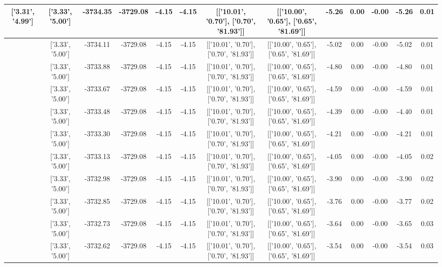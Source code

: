 \begin{table}[htbp]
\begin{adjustbox}{angle=90}
\begin{tabular}{|c|c|c|c|c|c|c|c|c|c|c|c|c|}
 ['3.31', '4.99'] & ['3.33', '5.00'] & -3734.35 & -3729.08 & -4.15 & -4.15 & [['10.01', '0.70'], ['0.70', '81.93']] & [['10.00', '0.65'], ['0.65', '81.69']] & -5.26 & 0.00 & -0.00 & -5.26 & 0.01\\ \hline
 ['3.31', '4.99'] & ['3.33', '5.00'] & -3734.11 & -3729.08 & -4.15 & -4.15 & [['10.01', '0.70'], ['0.70', '81.93']] & [['10.00', '0.65'], ['0.65', '81.69']] & -5.02 & 0.00 & -0.00 & -5.02 & 0.01\\ \hline
 ['3.31', '4.99'] & ['3.33', '5.00'] & -3733.88 & -3729.08 & -4.15 & -4.15 & [['10.01', '0.70'], ['0.70', '81.93']] & [['10.00', '0.65'], ['0.65', '81.69']] & -4.80 & 0.00 & -0.00 & -4.80 & 0.01\\ \hline
 ['3.31', '4.99'] & ['3.33', '5.00'] & -3733.67 & -3729.08 & -4.15 & -4.15 & [['10.01', '0.70'], ['0.70', '81.93']] & [['10.00', '0.65'], ['0.65', '81.69']] & -4.59 & 0.00 & -0.00 & -4.59 & 0.01\\ \hline
 ['3.32', '4.99'] & ['3.33', '5.00'] & -3733.48 & -3729.08 & -4.15 & -4.15 & [['10.01', '0.70'], ['0.70', '81.93']] & [['10.00', '0.65'], ['0.65', '81.69']] & -4.39 & 0.00 & -0.00 & -4.40 & 0.01\\ \hline
 ['3.32', '5.00'] & ['3.33', '5.00'] & -3733.30 & -3729.08 & -4.15 & -4.15 & [['10.01', '0.70'], ['0.70', '81.93']] & [['10.00', '0.65'], ['0.65', '81.69']] & -4.21 & 0.00 & -0.00 & -4.21 & 0.01\\ \hline
 ['3.32', '5.00'] & ['3.33', '5.00'] & -3733.13 & -3729.08 & -4.15 & -4.15 & [['10.01', '0.70'], ['0.70', '81.93']] & [['10.00', '0.65'], ['0.65', '81.69']] & -4.05 & 0.00 & -0.00 & -4.05 & 0.02\\ \hline
 ['3.32', '5.00'] & ['3.33', '5.00'] & -3732.98 & -3729.08 & -4.15 & -4.15 & [['10.01', '0.70'], ['0.70', '81.93']] & [['10.00', '0.65'], ['0.65', '81.69']] & -3.90 & 0.00 & -0.00 & -3.90 & 0.02\\ \hline
 ['3.32', '5.00'] & ['3.33', '5.00'] & -3732.85 & -3729.08 & -4.15 & -4.15 & [['10.01', '0.70'], ['0.70', '81.93']] & [['10.00', '0.65'], ['0.65', '81.69']] & -3.76 & 0.00 & -0.00 & -3.77 & 0.02\\ \hline
 ['3.32', '5.00'] & ['3.33', '5.00'] & -3732.73 & -3729.08 & -4.15 & -4.15 & [['10.01', '0.70'], ['0.70', '81.93']] & [['10.00', '0.65'], ['0.65', '81.69']] & -3.64 & 0.00 & -0.00 & -3.65 & 0.03\\ \hline
 ['3.32', '5.00'] & ['3.33', '5.00'] & -3732.62 & -3729.08 & -4.15 & -4.15 & [['10.01', '0.70'], ['0.70', '81.93']] & [['10.00', '0.65'], ['0.65', '81.69']] & -3.54 & 0.00 & -0.00 & -3.54 & 0.03\\ \hline

\end{tabular}
\end{adjustbox}
\end{table}

